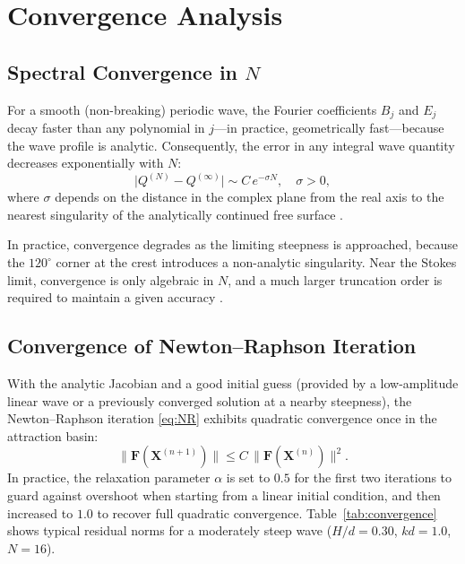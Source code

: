 \documentclass[journal,10pt,twocolumn]{IEEEtran}
\begin{document}
\section{Convergence Analysis}
\label{sec:convergence}

\subsection{Spectral Convergence in $N$}

For a smooth (non-breaking) periodic wave, the Fourier coefficients
$B_j$ and $E_j$ decay faster than any polynomial in $j$---in
practice, geometrically fast---because the wave profile is analytic.
Consequently, the error in any integral wave quantity decreases
exponentially with $N$:
\begin{equation}
    \bigl|Q^{(N)} - Q^{(\infty)}\bigr|
    \sim C\,e^{-\sigma N},
    \quad \sigma > 0,
\end{equation}
where $\sigma$ depends on the distance in the complex plane from the
real axis to the nearest singularity of the analytically continued
free surface \cite{Fenton1988,Schwartz1974}.

In practice, convergence degrades as the limiting steepness is
approached, because the $120^\circ$ corner at the crest introduces a
non-analytic singularity.
Near the Stokes limit, convergence is only algebraic in $N$, and a
much larger truncation order is required to maintain a given accuracy
\cite{Williams1981,LonguetHiggins1975}.

\subsection{Convergence of Newton--Raphson Iteration}

With the analytic Jacobian and a good initial guess (provided by a
low-amplitude linear wave or a previously converged solution at a
nearby steepness), the Newton--Raphson iteration \eqref{eq:NR}
exhibits quadratic convergence once in the attraction basin:
\begin{equation}
    \|\mathbf{F}(\mathbf{X}^{(n+1)})\|
    \le C\,\|\mathbf{F}(\mathbf{X}^{(n)})\|^2.
\end{equation}
In practice, the relaxation parameter $\alpha$ is set to $0.5$ for
the first two iterations to guard against overshoot when starting from
a linear initial condition, and then increased to $1.0$ to recover
full quadratic convergence.
Table~\ref{tab:convergence} shows typical residual norms for a
moderately steep wave ($H/d = 0.30$, $kd = 1.0$, $N = 16$).
\end{document}
